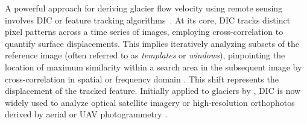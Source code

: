 



A powerful approach for deriving glacier flow velocity using remote sensing involves DIC or 
feature tracking algorithms~\citep{ahn_box_2010, Giordan2016, Hadhri2019}.
At its core, DIC tracks distinct pixel patterns across a time series of images, employing cross-correlation to quantify 
surface displacements. 
This implies iteratively analyzing subsets of the reference image (often referred to as \textit{templates} 
or \textit{windows}), pinpointing the location of maximum similarity within a search area in the subsequent 
image by cross-correlation in spatial \citep{Scambos1992} or frequency domain \citep{rolstad1997}.
This shift represents the displacement of the tracked feature.
Initially applied to glaciers by \cite{Scambos1992}, DIC is now widely used to analyze optical satellite imagery
\citep{Scambos1992, Scherler2008, Heid2012_evaluation_xcorr} or high-resolution orthophotos derived by aerial or 
UAV photogrammetry \citep{Immerzeel2014, Chudley2019, ioli2021mid}.


